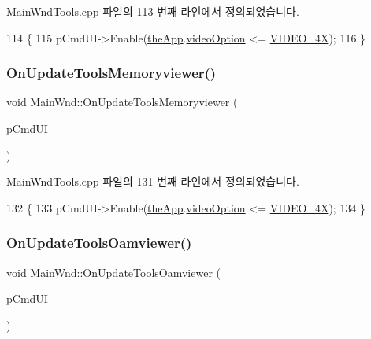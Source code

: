 Main\+Wnd\+Tools.\+cpp 파일의 113 번째 라인에서 정의되었습니다.


\begin{DoxyCode}
114 \{
115   pCmdUI->Enable(\mbox{\hyperlink{_v_b_a_8cpp_a8095a9d06b37a7efe3723f3218ad8fb3}{theApp}}.\mbox{\hyperlink{class_v_b_a_a17dac073149c897f770c00ed7098ad32}{videoOption}} <= \mbox{\hyperlink{_v_b_a_8h_a531c35e38ede3ea4e5ba5afb24b29493a6468bce6b84e6350d3de126f257eb38d}{VIDEO\_4X}});
116 \}
\end{DoxyCode}
\mbox{\label{class_main_wnd_afaa4badc2595220f6bf9c38f337fd287}} 
\subsubsection{\texorpdfstring{On\+Update\+Tools\+Memoryviewer()}{OnUpdateToolsMemoryviewer()}}
{\footnotesize\ttfamily void Main\+Wnd\+::\+On\+Update\+Tools\+Memoryviewer (\begin{DoxyParamCaption}\item[{C\+Cmd\+UI $\ast$}]{p\+Cmd\+UI }\end{DoxyParamCaption})\hspace{0.3cm}{\ttfamily [protected]}}



Main\+Wnd\+Tools.\+cpp 파일의 131 번째 라인에서 정의되었습니다.


\begin{DoxyCode}
132 \{
133   pCmdUI->Enable(\mbox{\hyperlink{_v_b_a_8cpp_a8095a9d06b37a7efe3723f3218ad8fb3}{theApp}}.\mbox{\hyperlink{class_v_b_a_a17dac073149c897f770c00ed7098ad32}{videoOption}} <= \mbox{\hyperlink{_v_b_a_8h_a531c35e38ede3ea4e5ba5afb24b29493a6468bce6b84e6350d3de126f257eb38d}{VIDEO\_4X}});
134 \}
\end{DoxyCode}
\mbox{\label{class_main_wnd_afa65b90a781b4edc8122ed4673115202}} 
\subsubsection{\texorpdfstring{On\+Update\+Tools\+Oamviewer()}{OnUpdateToolsOamviewer()}}
{\footnotesize\ttfamily void Main\+Wnd\+::\+On\+Update\+Tools\+Oamviewer (\begin{DoxyParamCaption}\item[{C\+Cmd\+UI $\ast$}]{p\+Cmd\+UI }\end{DoxyParamCaption})\hspace{0.3cm}{\ttfamily [protected]}}



